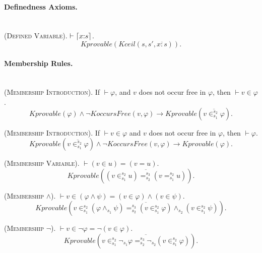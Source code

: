 \documentclass[UTF8,11pt]{article}
\theoremstyle{plain}
\theoremstyle{definition}
\theoremstyle{remark}
\DeclarePairedDelimiter{\ceil}{\lceil}{\rceil}
\newcommand{\cln}{{:}}
\newcommand{\Kceil}{\mathit{Kceil}}
\newcommand{\KoccursFree}{\mathit{KoccursFree}}
\newcommand{\Kdeduce}{\mathit{Kprovable}}
\begin{document}
\paragraph{Definedness Axioms.}\quad
\\

(\textsc{Defined Variable}).
$\vdash \ceil{x \cln s}$.
\begin{equation*}
\Kdeduce(\Kceil(s, s', \overline{x \cln s})).
\end{equation*}

\paragraph{Membership Rules.}\quad
\\


(\textsc{Membership Introduction}).
If $\vdash \varphi$, and $v$ does not occur free in $\varphi$, then $\vdash v 
\in \varphi$.
\begin{equation*}
\Kdeduce(\varphi) \wedge \neg \KoccursFree(v, \varphi) \to \Kdeduce(\overline{v 
\in_{s_1}^{s_2} \varphi}).
\end{equation*}

(\textsc{Membership Introduction}).
If $\vdash v \in \varphi$ and $v$ does not occur free in $\varphi$, then 
$\vdash \varphi$.
\begin{equation*}
\Kdeduce(\overline{v \in_{s_1}^{s_2} \varphi}) \wedge \neg 
\KoccursFree(v, \varphi) \to \Kdeduce(\varphi).
\end{equation*}

(\textsc{Membership Variable}).
$\vdash (v \in u) = (v = u)$.
\begin{equation*}
\Kdeduce(\overline{(v \in_{s_1}^{s_2} u) =_{s_2}^{s_3} (v =_{s_1}^{s_2} u)}).
\end{equation*}

(\textsc{Membership $\wedge$}).
$\vdash v \in (\varphi \wedge \psi) = (v \in \varphi) \wedge (v \in \psi).$
\begin{equation*}
\Kdeduce(\overline{v \in_{s_1}^{s_2} (\varphi \wedge_{s_1} \psi) =_{s_2}^{s_3} 
(v \in_{s_1}^{s_2} \varphi) \wedge_{s_2} (v \in_{s_1}^{s_2} \psi)}).
\end{equation*}

(\textsc{Membership $\neg$}).
$\vdash v \in \neg \varphi = \neg (v \in \varphi)$.
\begin{equation*}
\Kdeduce(\overline{v \in_{s_1}^{s_2} \neg_{s_1} \varphi =_{s_2}^{s_3} 
\neg_{s_2} (v \in_{s_1}^{s_2} \varphi)}).
\end{equation*}
\end{document}
